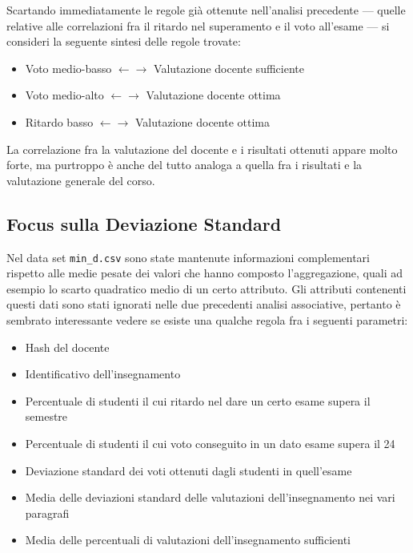             Scartando immediatamente le regole già ottenute nell'analisi precedente --- quelle relative alle correlazioni fra il ritardo nel superamento e il voto all'esame --- si consideri la seguente sintesi delle regole trovate:

            \begin{itemize}
                \item Voto medio-basso $\leftarrow \rightarrow$ Valutazione docente sufficiente
                \item Voto medio-alto $\leftarrow \rightarrow$ Valutazione docente ottima
                \item Ritardo basso $\leftarrow \rightarrow$ Valutazione docente ottima
            \end{itemize}

            La correlazione fra la valutazione del docente e i risultati ottenuti appare molto forte, ma purtroppo è anche del tutto analoga a quella fra i risultati e la valutazione generale del corso.

        \subsection{Focus sulla Deviazione Standard}

        Nel data set \texttt{min\_d.csv} sono state mantenute informazioni complementari rispetto alle medie pesate dei valori che hanno composto l'aggregazione, quali ad esempio lo scarto quadratico medio di un certo attributo. Gli attributi contenenti questi dati sono stati ignorati nelle due precedenti analisi associative, pertanto è sembrato interessante vedere se esiste una qualche regola fra i seguenti parametri:

            \begin{itemize}
                \item Hash del docente
                \item Identificativo dell'insegnamento
                \item Percentuale di studenti il cui ritardo nel dare un certo esame supera il semestre
                \item Percentuale di studenti il cui voto conseguito in un dato esame supera il 24
                \item Deviazione standard dei voti ottenuti dagli studenti in quell'esame
                \item Media delle deviazioni standard delle valutazioni dell'insegnamento nei vari paragrafi
                \item Media delle percentuali di valutazioni dell'insegnamento sufficienti  
            \end{itemize}

